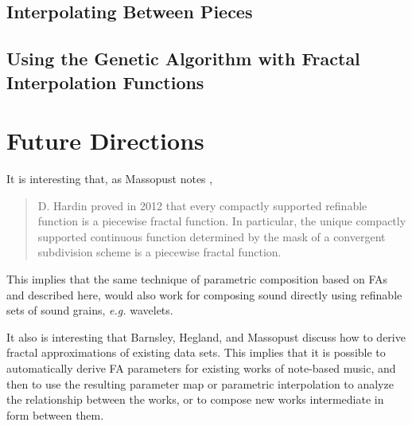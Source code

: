 \documentclass[english,11pt,letterpaper,onecolumn]{scrartcl}
\numberwithin{equation}{section}
\begin{document}
\subsection{Interpolating Between Pieces}

\subsection{Using the Genetic Algorithm with Fractal Interpolation
Functions}

\section{Future Directions}

It is interesting that, as Massopust notes \cite{massopust2017}, \begin{quote}D.
Hardin proved in 2012 that every compactly supported refinable function is a
piecewise fractal function. In particular, the unique compactly supported
continuous function determined by the mask of a convergent subdivision scheme is
a piecewise fractal function. \end{quote} This implies that the same technique
of parametric composition based on FAs and described here, would also work for
composing sound directly using refinable sets of sound grains, \textit{e.g.}
wavelets.

It also is interesting that Barnsley, Hegland, and Massopust
\cite{2013arXiv1309.0972B} discuss how to derive fractal approximations of
existing data sets. This implies that it is possible to automatically derive FA
parameters for existing works of note-based music, and then to use the resulting
parameter map or parametric interpolation to analyze the relationship between
the works, or to compose new works intermediate in form between them.

\printbibliography
\end{document}
